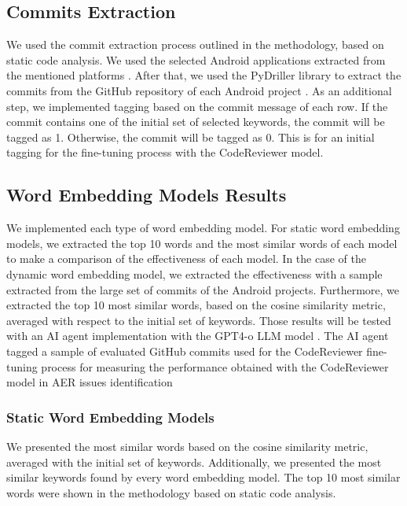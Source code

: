 \subsection{Commits Extraction}
We used the commit extraction process outlined in the methodology, based on static code analysis. We used the selected Android applications extracted from the mentioned platforms \cite{seart,fdroid}. After that, we used the PyDriller library to extract the commits from the GitHub repository of each Android project \cite{pydriller}.  As an additional step, we implemented tagging based on the commit message of each row. If the commit contains one of the initial set of selected keywords, the commit will be tagged as 1. Otherwise, the commit will be tagged as 0. This is for an initial tagging for the fine-tuning process with the CodeReviewer model.


\subsection{Word Embedding Models Results}
We implemented each type of word embedding model. For static word embedding models, we extracted the top 10 words and the most similar words of each model to make a comparison of the effectiveness of each model. In the case of the dynamic word embedding model, we extracted the effectiveness with a sample extracted from the large set of commits of the Android projects. Furthermore, we extracted the top 10 most similar words, based on the cosine similarity metric, averaged with respect to the initial set of keywords. 
Those results will be tested with an AI agent implementation with the GPT4-o LLM model \cite{gpt4reference}. The AI agent tagged a sample of evaluated GitHub commits used for the CodeReviewer fine-tuning process for measuring the performance obtained with the CodeReviewer model in AER issues identification


\subsubsection{Static Word Embedding Models}
We presented the most similar words based on the cosine similarity metric, averaged with the initial set of keywords. Additionally, we presented the most similar keywords found by every word embedding model. The top 10 most similar words were shown in the methodology based on static code analysis.

